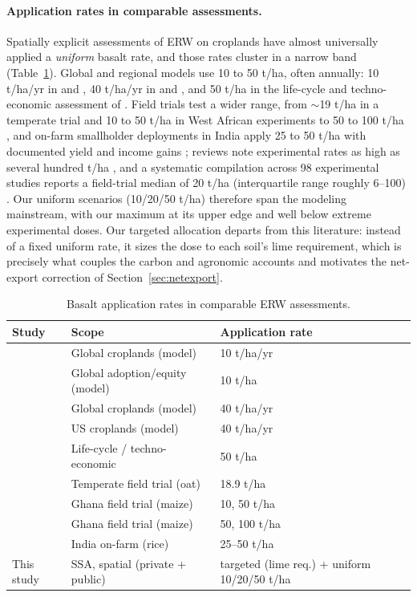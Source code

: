 \documentclass[12pt]{article}
\begin{document}
\paragraph{Application rates in comparable assessments.}
Spatially explicit assessments of ERW on croplands have almost universally
applied a \emph{uniform} basalt rate, and those rates cluster in a narrow band
(Table~\ref{tab:rates}). Global and regional models use 10 to 50 t/ha, often
annually: 10 t/ha/yr in \citet{baek2023} and \citet{tu2026}, 40 t/ha/yr in
\citet{beerling2020} and \citet{beerling2025}, and 50 t/ha in the life-cycle and
techno-economic assessment of \citet{kroeger2026}. Field trials test a wider
range, from $\sim$19 t/ha in a temperate trial \citep{skov2024} and 10 to 50 t/ha
in West African experiments \citep{oppongdanso2025} to 50 to 100 t/ha
\citep{akortey2026}, and on-farm smallholder deployments in India apply 25 to 50
t/ha with documented yield and income gains \citep{jordan2026}; reviews note
experimental rates as high as several hundred t/ha \citep{schiedung2026}, and a
systematic compilation across 98 experimental studies reports a field-trial
median of 20 t/ha (interquartile range roughly 6--100)
\citep{suhrhoff2026esroc}. Our uniform scenarios
(10/20/50 t/ha) therefore span the modeling mainstream, with our maximum at its
upper edge and well below extreme experimental doses. Our targeted allocation
departs from this literature: instead of a fixed uniform rate, it sizes the dose
to each soil's lime requirement, which is precisely what couples the carbon and
agronomic accounts and motivates the net-export correction of
Section~\ref{sec:netexport}.

\begin{table}[t]
\centering
\caption{Basalt application rates in comparable ERW assessments.}
\label{tab:rates}
\small
\begin{tabular}{l l p{3.7cm}}
\toprule
Study & Scope & Application rate \\
\midrule
\citet{baek2023}        & Global croplands (model)        & 10 t/ha/yr \\
\citet{tu2026}          & Global adoption/equity (model)  & 10 t/ha \\
\citet{beerling2020}    & Global croplands (model)        & 40 t/ha/yr \\
\citet{beerling2025}    & US croplands (model)            & 40 t/ha/yr \\
\citet{kroeger2026}     & Life-cycle / techno-economic    & 50 t/ha \\
\citet{skov2024}        & Temperate field trial (oat)     & 18.9 t/ha \\
\citet{oppongdanso2025} & Ghana field trial (maize)       & 10, 50 t/ha \\
\citet{akortey2026}     & Ghana field trial (maize)       & 50, 100 t/ha \\
\citet{jordan2026}      & India on-farm (rice)            & 25--50 t/ha \\
\midrule
This study              & SSA, spatial (private + public) & targeted (lime req.) + uniform 10/20/50 t/ha \\
\bottomrule
\end{tabular}
\end{table}
\end{document}
